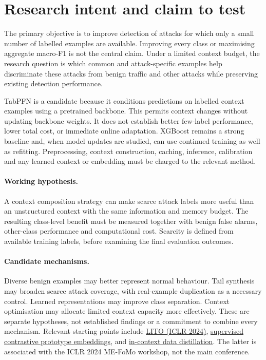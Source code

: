 \section{Research intent and claim to test}
The primary objective is to improve detection of attacks for which only a small number of labelled examples are available. Improving every class or maximising aggregate macro-F1 is not the central claim. Under a limited context budget, the research question is which common and attack-specific examples help discriminate these attacks from benign traffic and other attacks while preserving existing detection performance.

TabPFN is a candidate because it conditions predictions on labelled context examples using a pretrained backbone. This permits context changes without updating backbone weights. It does not establish better few-label performance, lower total cost, or immediate online adaptation. XGBoost remains a strong baseline and, when model updates are studied, can use continued training as well as refitting. Preprocessing, context construction, caching, inference, calibration and any learned context or embedding must be charged to the relevant method.

\paragraph{Working hypothesis.} A context composition strategy can make scarce attack labels more useful than an unstructured context with the same information and memory budget. The resulting class-level benefit must be measured together with benign false alarms, other-class performance and computational cost. Scarcity is defined from available training labels, before examining the final evaluation outcomes.

\paragraph{Candidate mechanisms.} Diverse benign examples may better represent normal behaviour. Tail synthesis may broaden scarce attack coverage, with real-example duplication as a necessary control. Learned representations may improve class separation. Context optimisation may allocate limited context capacity more effectively. These are separate hypotheses, not established findings or a commitment to combine every mechanism. Relevant starting points include \href{https://proceedings.iclr.cc/paper_files/paper/2024/file/5d54d2df6ec8f7b920aa0fec9a6d1b2e-Paper-Conference.pdf}{LITO (ICLR 2024)}, \href{https://github.com/mlopezm/Supervised-contrastive-learning-over-prototype-label-embeddings}{supervised contrastive prototype embeddings}, and \href{https://arxiv.org/abs/2402.06971}{in-context data distillation}. The latter is associated with the ICLR 2024 ME-FoMo workshop, not the main conference.
